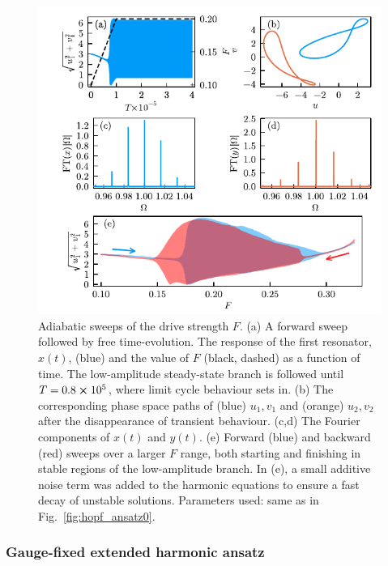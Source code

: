 \begin{figure} [h!]
	\centering
	\includegraphics{figures/limit_cycles/2_duffings_timedep.pdf}
	\caption{Adiabatic sweeps of the drive strength $F$. (a) A forward sweep followed by free time-evolution. The response of the first resonator, $x(t)$, (blue) and the value of $F$ (black, dashed) as a function of time. The low-amplitude steady-state branch is followed until $T = 0.8\cross10^{5}$, where limit cycle behaviour sets in. (b) The corresponding phase space paths of (blue) $u_1, v_1$ and (orange) $u_2, v_2$ after the disappearance of transient behaviour. (c,d) The Fourier components of $x(t)$ and $y(t)$. (e) Forward (blue) and backward (red) sweeps over a larger $F$ range, both starting and finishing in stable regions of the low-amplitude branch. In (e), a small additive noise term was added to the harmonic equations to ensure a fast decay of unstable solutions. Parameters used: same as in Fig.~\ref{fig:hopf_ansatz0}.}
	\label{fig:hopf_timedep}
\end{figure}

 
\subsubsection{Gauge-fixed extended harmonic ansatz}

